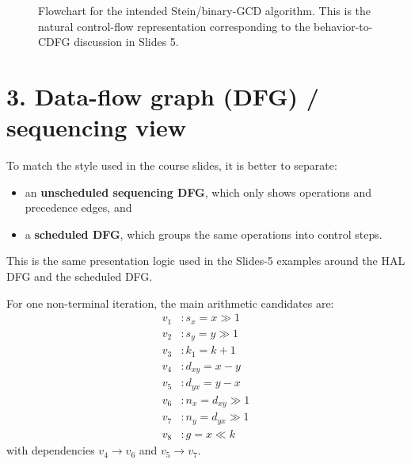 \documentclass[11pt,a4paper]{article}
\begin{document}
\begin{figure}[h!]
{%
}
\caption{Flowchart for the intended Stein/binary-GCD algorithm. This is the natural control-flow representation corresponding to the behavior-to-CDFG discussion in Slides 5.}
\end{figure}

\clearpage
\section*{3. Data-flow graph (DFG) / sequencing view}
To match the style used in the course slides, it is better to separate:
\begin{itemize}
  \item an \textbf{unscheduled sequencing DFG}, which only shows operations and precedence edges, and
  \item a \textbf{scheduled DFG}, which groups the same operations into control steps.
\end{itemize}

This is the same presentation logic used in the Slides-5 examples around the HAL DFG and the scheduled DFG.

For one non-terminal iteration, the main arithmetic candidates are:
\[
\begin{aligned}
v_1 &: s_x = x \gg 1 \\
v_2 &: s_y = y \gg 1 \\
v_3 &: k_1 = k + 1 \\
v_4 &: d_{xy} = x - y \\
v_5 &: d_{yx} = y - x \\
v_6 &: n_x = d_{xy} \gg 1 \\
v_7 &: n_y = d_{yx} \gg 1 \\
v_8 &: g = x \ll k
\end{aligned}
\]
with dependencies $v_4 \rightarrow v_6$ and $v_5 \rightarrow v_7$.
\end{document}

